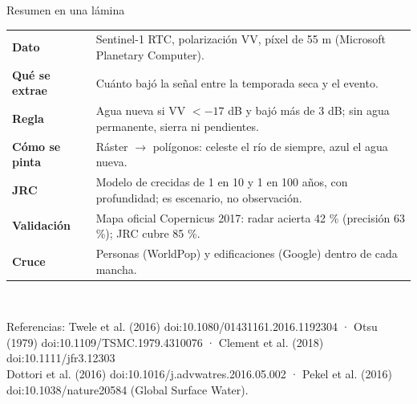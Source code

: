 \documentclass[aspectratio=169,11pt]{beamer}
\begin{document}
\begin{frame}{Resumen en una lámina}
\small
\begin{tabularx}{\textwidth}{@{}>{\bfseries}l X@{}}
\toprule
Dato & Sentinel-1 RTC, polarización VV, píxel de 55 m (Microsoft Planetary Computer).\\
Qué se extrae & Cuánto bajó la señal entre la temporada seca y el evento.\\
Regla & Agua nueva si VV $<-17$ dB y bajó más de 3 dB; sin agua permanente, sierra ni pendientes.\\
Cómo se pinta & Ráster $\rightarrow$ polígonos: celeste el río de siempre, azul el agua nueva.\\
JRC & Modelo de crecidas de 1 en 10 y 1 en 100 años, con profundidad; es escenario, no observación.\\
Validación & Mapa oficial Copernicus 2017: radar acierta 42 \% (precisión 63 \%); JRC cubre 85 \%.\\
Cruce & Personas (WorldPop) y edificaciones (Google) dentro de cada mancha.\\
\bottomrule
\end{tabularx}\\[6pt]
\scriptsize\raggedright Referencias: Twele et al. (2016) doi:10.1080/01431161.2016.1192304 · Otsu (1979) doi:10.1109/TSMC.1979.4310076 ·
Clement et al. (2018) doi:10.1111/jfr3.12303\\ Dottori et al. (2016) doi:10.1016/j.advwatres.2016.05.002 · Pekel et al. (2016) doi:10.1038/nature20584 (Global Surface Water).
\end{frame}
\end{document}
